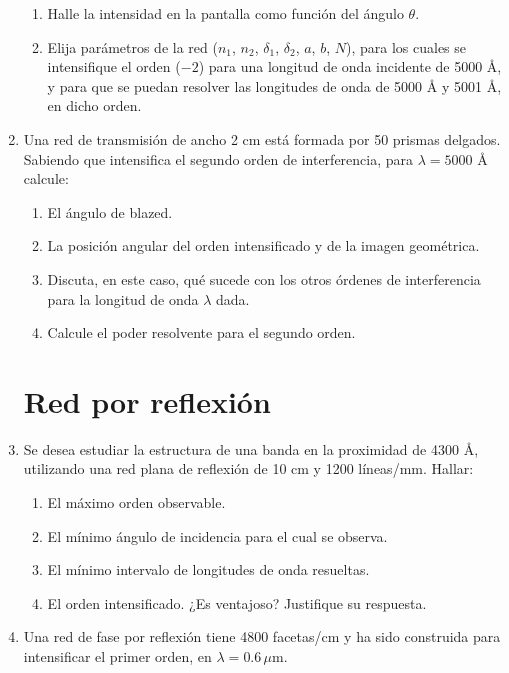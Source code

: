 \documentclass[11pt,spanish,a4paper]{article}
\begin{document}
\begin{enumerate}
\begin{figure}[H]
\end{figure}
\begin{enumerate}
\item Halle la intensidad en la pantalla como función del ángulo $\theta$. 
\item Elija parámetros de la red ($n_{1}$, $n_{2}$, $\delta_{1}$, $\delta_{2}$,
$a$, $b$, $N$), para los cuales se intensifique el orden ($-2$)
para una longitud de onda incidente de 5000 Å, y para que se puedan
resolver las longitudes de onda de 5000 Å y 5001 Å, en dicho orden. 
\end{enumerate}


\item Una red de transmisión de ancho 2 cm está formada por 50 prismas delgados.
Sabiendo que intensifica el segundo orden de interferencia, para $\lambda=5000$
Å calcule: 
\begin{enumerate}
\item El ángulo de blazed. 
\item La posición angular del orden intensificado y de la imagen geométrica. 
\item Discuta, en este caso, qué sucede con los otros órdenes de interferencia
para la longitud de onda $\lambda$ dada.
\item Calcule el poder resolvente para el segundo orden. 
\end{enumerate}


\section*{Red por reflexión}

\item Se desea estudiar la estructura de una banda en la proximidad de 4300
Å, utilizando una red plana de reflexión de 10 cm y 1200 líneas/mm.
Hallar:
\begin{enumerate}
\item El máximo orden observable. 
\item El mínimo ángulo de incidencia para el cual se observa. 
\item El mínimo intervalo de longitudes de onda resueltas. 
\item El orden intensificado. ¿Es ventajoso? Justifique su respuesta. 
\end{enumerate}
\item Una red de fase por reflexión tiene 4800 facetas/cm y ha sido construida
para intensificar el primer orden, en $\lambda=0.6\,\mu$m. 


\end{enumerate}
\end{document}
